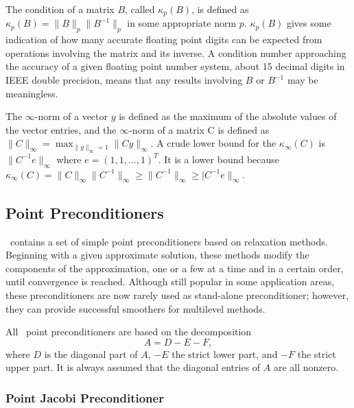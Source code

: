 The condition of a matrix $B$, called $\kappa_p(B)$, is defined as
$\kappa_p(B) = \|B\|_p\|B^{-1}\|_p$ in some appropriate norm $p$. 
$\kappa_p(B)$
gives some indication of how many accurate floating point
digits can be expected from operations involving the matrix and its
inverse.  A condition number approaching the accuracy of a given
floating point number system, about 15 decimal digits in IEEE double
precision, means that any results involving $B$ or $B^{-1}$ may be
meaningless.

The $\infty$-norm of a vector $y$ is defined as the maximum of the
absolute values of the vector entries, and the $\infty$-norm of a
matrix C is defined as
$\|C\|_\infty = \max_{\|y\|_\infty = 1} \|Cy\|_\infty$.
A crude lower bound for the $\kappa_\infty(C)$ is
$\|C^{-1}e\|_\infty$ where $e = (1, 1, \ldots, 1)^T$.  It is a
lower bound because $\kappa_\infty(C) = \|C\|_\infty\|C^{-1}\|_\infty
\ge \|C^{-1}\|_\infty \ge |C^{-1}e\|_\infty$. 

\subsection{Point Preconditioners}
\label{sec:point}

\ifpack\ contains a set of simple point preconditioners based on relaxation
methods.
Beginning with a given approximate solution, these methods modify the
components of the approximation, one or a few at a time and in a certain order,
until convergence is reached. Although still popular in some application
areas, these preconditioners are now
rarely used as stand-alone preconditioner; however, they can provide successful smoothers for multilevel
methods. 

All \ifpack\ point preconditioners are based on the decomposition
\begin{equation}
\label{eq:splitting}
A = D - E - F,
\end{equation}
where $D$ is the diagonal part of $A$, $-E$ the strict lower part, and 
$-F$ the strict upper part. It is always assumed that the diagonal entries of
$A$ are all nonzero.

\subsubsection{Point Jacobi Preconditioner}
\label{sec:jacobi}

